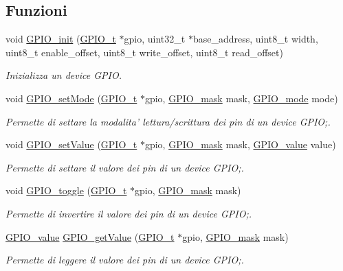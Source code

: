 \subsection*{Funzioni}
\begin{DoxyCompactItemize}
\item 
void \hyperlink{group___g_p_i_o_gad3d8f07163fbe858774e769eb6d755db}{G\+P\+I\+O\+\_\+init} (\hyperlink{struct_g_p_i_o__t}{G\+P\+I\+O\+\_\+t} $\ast$gpio, uint32\+\_\+t $\ast$base\+\_\+address, uint8\+\_\+t width, uint8\+\_\+t enable\+\_\+offset, uint8\+\_\+t write\+\_\+offset, uint8\+\_\+t read\+\_\+offset)
\begin{DoxyCompactList}\small\item\em Inizializza un device G\+P\+I\+O. \end{DoxyCompactList}\item 
void \hyperlink{group___g_p_i_o_ga3f18ccfbb70d89cc7e2b06712dd82eb7}{G\+P\+I\+O\+\_\+set\+Mode} (\hyperlink{struct_g_p_i_o__t}{G\+P\+I\+O\+\_\+t} $\ast$gpio, \hyperlink{group___g_p_i_o_ga6d5aef8a8a54ee2f602d47252ff66595}{G\+P\+I\+O\+\_\+mask} mask, \hyperlink{group___g_p_i_o_ga894e6ae857ed4a9aedd04fff44a6770e}{G\+P\+I\+O\+\_\+mode} mode)
\begin{DoxyCompactList}\small\item\em Permette di settare la modalita' lettura/scrittura dei pin di un device G\+P\+I\+O;. \end{DoxyCompactList}\item 
void \hyperlink{group___g_p_i_o_ga86b232ed74eacf9aa723cb1d7917a156}{G\+P\+I\+O\+\_\+set\+Value} (\hyperlink{struct_g_p_i_o__t}{G\+P\+I\+O\+\_\+t} $\ast$gpio, \hyperlink{group___g_p_i_o_ga6d5aef8a8a54ee2f602d47252ff66595}{G\+P\+I\+O\+\_\+mask} mask, \hyperlink{group___g_p_i_o_ga495d9a7aa735fe416a3f110337c54967}{G\+P\+I\+O\+\_\+value} value)
\begin{DoxyCompactList}\small\item\em Permette di settare il valore dei pin di un device G\+P\+I\+O;. \end{DoxyCompactList}\item 
void \hyperlink{group___g_p_i_o_ga2f516854e98cd048d4d1ee6f86261f8c}{G\+P\+I\+O\+\_\+toggle} (\hyperlink{struct_g_p_i_o__t}{G\+P\+I\+O\+\_\+t} $\ast$gpio, \hyperlink{group___g_p_i_o_ga6d5aef8a8a54ee2f602d47252ff66595}{G\+P\+I\+O\+\_\+mask} mask)
\begin{DoxyCompactList}\small\item\em Permette di invertire il valore dei pin di un device G\+P\+I\+O;. \end{DoxyCompactList}\item 
\hyperlink{group___g_p_i_o_ga495d9a7aa735fe416a3f110337c54967}{G\+P\+I\+O\+\_\+value} \hyperlink{group___g_p_i_o_gaf388b01cd7459baae5c03c744f611724}{G\+P\+I\+O\+\_\+get\+Value} (\hyperlink{struct_g_p_i_o__t}{G\+P\+I\+O\+\_\+t} $\ast$gpio, \hyperlink{group___g_p_i_o_ga6d5aef8a8a54ee2f602d47252ff66595}{G\+P\+I\+O\+\_\+mask} mask)
\begin{DoxyCompactList}\small\item\em Permette di leggere il valore dei pin di un device G\+P\+I\+O;. \end{DoxyCompactList}\end{DoxyCompactItemize}



